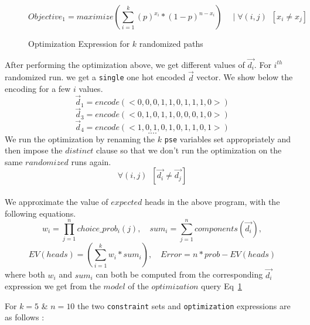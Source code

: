 \documentclass[usenames,dvipsnames,acmsmall]{acmart}
\begin{document}
\begin{figure}
	\begin{equation}	
		Objective_1 = maximize(\sum_{i=1}^{k}{(p)^{x_i} * (1-p)^{n-x_i}}) \quad \mid \forall (i, j) \enspace [{x_i} \neq {x_j}]
	\end{equation}
	\caption{Optimization Expression for $k$ randomized paths}
	\label{eq:optimization-1}
\end{figure}

After performing the optimization above, we get different values of $\vec{d_i}$. For $i^{th}$ randomized run. we get a \texttt{single} one hot encoded \texttt{$\vec{d}$} vector. We show below the encoding for a few $i$ values. 
\[
\vec{d}_{1} = encode(<0,0,0,1,1,0,1,1,1,0>)
\]
\[
\vec{d}_{3} = encode(<0,1,0,1,1,0,0,0,1,0>)
\]
\[
\vec{d}_{4} = encode(<1,0,1,0,1,0,1,1,0,1>)
\]
\[
	....
\]
We run the optimization by renaming the $k$ \texttt{pse} variables set appropriately and then impose the $distinct$ clause so that we don't run the optimization on the same $randomized$ runs again. \\
\begin{equation}	
	\forall (i, j) \enspace [\vec{d_i} \neq \vec{d_j}]
\end{equation} \\
We approximate the value of $expected$ heads in the above program, with the following equations.
\begin{equation}	
	w_i = \prod_{j=1}^n choice\_prob_{i}(j) ,
	\quad
	sum_i = \sum_{j=1}^n components(\vec{d_i}) ,
\end{equation}
\begin{equation}
	EV(heads) = (\sum_{i=1}^{k}{w_i * sum_i}),
	\quad
	Error = n * prob - EV(heads)
\end{equation}
where both $w_i$ and $sum_i$ can both be computed from the corresponding $\vec{d_i}$ expression we get from the $model$  of the $optimization$ query Eq~\ref{eq:optimization-1}

For $k = 5$ \& $n = 10$ the two \texttt{constraint} sets and \texttt{optimization} expressions are as follows : 
\end{document}
